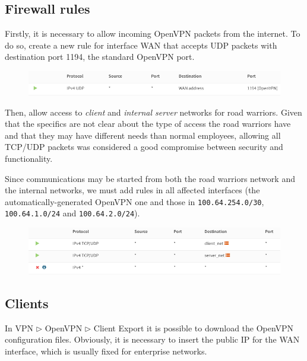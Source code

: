 \documentclass{homework}
\newcommand{\client}{\textit{client}\xspace}
\newcommand{\ser}{\textit{internal server}\xspace}
\begin{document}
    \subsection{Firewall rules}
    Firstly, it is necessary to allow incoming OpenVPN packets from the internet.
    To do so, create a new rule for interface WAN that accepts UDP packets with destination port 1194, the standard OpenVPN port.
    \begin{figure}[H]
        \centering
        \includegraphics[width=\linewidth]{openvpn/rules-vpn}
        \label{fig:openvpn-rules-vpn}
    \end{figure}
    
    Then, allow access to \client and \ser networks for road warriors.
    Given that the specifics are not clear about the type of access the road warriors have and that they may have different needs than normal employees, allowing all TCP/UDP packets was considered a good compromise between security and functionality.
    
    Since communications may be started from both the road warriors network and the internal networks, we must add rules in all affected interfaces (the automatically-generated OpenVPN one and those in \texttt{100.64.254.0/30}, \texttt{100.64.1.0/24} and \texttt{100.64.2.0/24}).
    \begin{figure}[H]
        \centering
        \includegraphics[width=\linewidth]{openvpn/rules-clients}
        \label{fig:rules-clients}
    \end{figure}
       
    \subsection{Clients}
    In VPN $\triangleright$ OpenVPN $\triangleright$ Client Export it is possible to download the OpenVPN configuration files.
    Obviously, it is necessary to insert the public IP for the WAN interface, which is usually fixed for enterprise networks.
    
\end{document}
